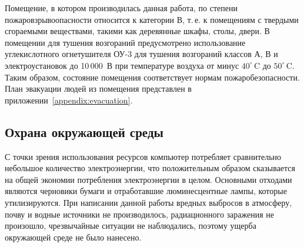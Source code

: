 
Помещение, в котором производилась данная работа, по степени пожаровзрывоопасности относится к категории В, т.\,е. к помещениям с твердыми сгораемыми веществами, такими как деревянные шкафы, столы, двери.
В помещении для тушения возгораний предусмотрено использование углекислотного огнетушителя ОУ-3 для тушения возгораний классов А, В и электроустановок до 10\,000~В при температуре воздуха от минус $40^\circ$\,C до $50^\circ$\,C. 
Таким образом, состояние помещения соответствует нормам пожаробезопасности. 
План эвакуации людей из помещения представлен в приложении~\ref{appendix:evacuation}.


\subsection{Охрана окружающей среды}

С точки зрения использования ресурсов компьютер потребляет сравнительно небольшое количество электроэнергии, что положительным образом сказывается на общей экономии потребления электроэнергии в целом.
Основными отходами являются черновики бумаги и отработавшие люминесцентные лампы, которые утилизируются.
При написании данной работы вредных выбросов в атмосферу, почву и водные источники не производилось, радиационного заражения не произошло, чрезвычайные ситуации не наблюдались, поэтому ущерба окружающей среде не было нанесено.


